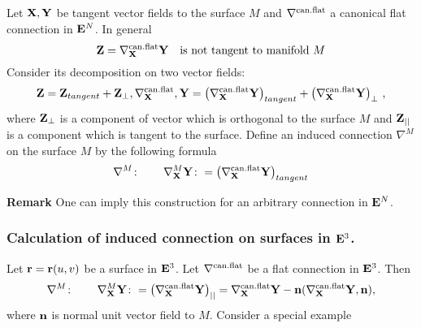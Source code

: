 \documentclass[12pt]{article}
\theoremstyle{theorem}
\numberwithin{equation}{section}
\begin{document}
    Let ${\bf X},{\bf Y}$ be tangent vector fields to the surface $M$ and $\nabla^{\rm can.flat}$ a canonical flat
    connection in ${\bf E}^N$.
    In general
            \begin{equation}\label{nottangent!}
                {\bf Z}=    \nabla^{\rm can.flat}_{\bf X}{\bf Y}\quad \hbox{is not tangent to manifold $M$}
                \end{equation}
                Consider its decomposition on two vector fields:
                          \begin{equation}\label{nottangent!2}
             {\bf Z}={\bf Z}_{tangent}+{\bf Z}_\bot,       \nabla^{\rm can.flat}_{\bf X},{\bf Y}=
                    \left(\nabla^{\rm can.flat}_{\bf X}{\bf Y}\right)_{tangent}+
                    \left(\nabla^{\rm can.flat}_{\bf X}{\bf Y}\right)_{\bot}\,,
                \end{equation}
where ${\bf Z}_{\bot}$ is a component of vector which is orthogonal to the surface $M$ and ${\bf Z}_{||}$ is a component which
is tangent to the surface. Define an induced connection $\nabla^{M}$ on the surface $M$ by the following formula
\begin{equation}\label{inducedconnection1}
\nabla^{M}\colon\qquad \nabla^{M}_{\bf X}{\bf Y} \colon =\left(\nabla^{\rm can.flat}_{\bf X}{\bf Y}\right)_{tangent}
\end{equation}

{\bf Remark} One can imply this construction for an arbitrary connection in ${\bf E}^N$.

\subsubsection {Calculation of induced connection on surfaces in ${\bf E}^3$.}

Let ${\bf r}={\bf r}(u,v)$ be a surface in ${\bf E}^3$. Let $\nabla^{\rm can.flat}$ be a flat connection in ${\bf E}^3$.
   Then
\begin{equation}\label{inducedconnection1}
\nabla^{M}\colon\qquad \nabla^{M}_{\bf X}{\bf Y} \colon =\left(\nabla^{\rm can.flat}_{\bf X}{\bf Y}\right)_{||}=
\nabla^{\rm can.flat}_{\bf X}{\bf Y}-
{\bf n}(\nabla^{\rm can.flat}_{\bf X}{\bf Y},{\bf n}),
\end{equation}
where ${\bf n}$ is normal unit vector field to $M$. Consider a special example
\end{document}
